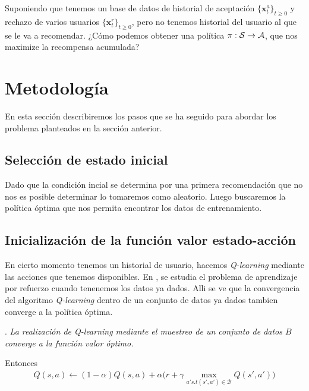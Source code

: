 \begin{problem}\label{prob2}
    Suponiendo que tenemos un base de datos de historial de aceptación $\{ \bm{x}_t^a\}_{t\geq 0}$ y rechazo de varios usuarios $\{ \bm{x}_t^r\}_{t\geq 0}$, pero no tenemos historial del usuario al que se le va a recomendar. ¿Cómo podemos obtener una política $\pi: \mathcal{S} \rightarrow \mathcal{A} $, que nos maximize la recompensa acumulada?
\end{problem}







\section{Metodología}

En esta sección describiremos los pasos que se ha seguido para abordar los problema planteados en la sección anterior.

\subsection{Selección de estado inicial}

Dado que la condición incial se determina por una primera recomendación que no nos es posible determinar lo tomaremos como aleatorio. Luego buscaremos la política óptima que nos permita encontrar los datos de entrenamiento. 

\subsection{Inicialización de la función valor estado-acción}\label{InitQ}

En cierto momento tenemos un historial de usuario, hacemos \emph{Q-learning} mediante las acciones que tenemos disponibles. En \cite{fujimoto2019off}, se estudia el problema de aprendizaje por refuerzo cuando tenenemos los datos ya dados. Alli se ve que la convergencia del algoritmo \emph{Q-learning} dentro de un conjunto de datos ya dados tambien converge a la política óptima.

\begin{thm}
    \cite{fujimoto2019off}. \textit{La realización de Q-learning mediante el muestreo de un conjunto de datos $B$ converge a la función valor óptimo.}
\end{thm}

Entonces 
\begin{gather}
    Q(s,a) \leftarrow (1-\alpha)Q(s,a) + \alpha \bigg( r +\gamma \max_{a' s.t (s',a') \in \mathcal{B}} Q(s',a') \bigg)
\end{gather}

